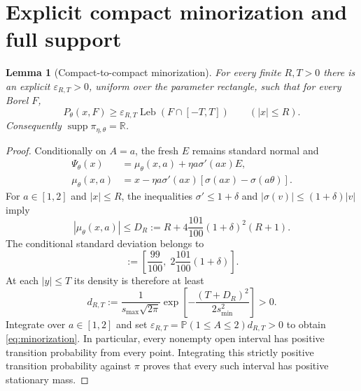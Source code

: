 \documentclass[11pt,a4paper]{article}
\numberwithin{equation}{section}
\newtheorem{lemma}[theorem]{Lemma}
\theoremstyle{remark}
\DeclareMathOperator{\Leb}{Leb}
\DeclareMathOperator{\supp}{supp}
\newcommand{\Pp}{\mathbb P}
\newcommand{\R}{\mathbb R}
\begin{document}
\section{Explicit compact minorization and full support}\label{sec:minorization}

\begin{lemma}[Compact-to-compact minorization]\label{lem:minorization}
For every finite $R,T>0$ there is an explicit $\varepsilon_{R,T}>0$,
uniform over the parameter rectangle, such that for every Borel $F$,
\begin{equation}
 P_\theta(x,F)\ge\varepsilon_{R,T}
        \Leb(F\cap[-T,T])\qquad(|x|\le R).\label{eq:minorization}
\end{equation}
Consequently $\supp\pi_{\eta,\theta}=\R$.
\end{lemma}

\begin{proof}
Conditionally on $A=a$, the fresh $E$ remains standard normal and
\begin{align}
 \Psi_\theta(x)&=\mu_\theta(x,a)+\eta a\sigma'(ax)E,\nonumber\\
 \mu_\theta(x,a)&=x-\eta a\sigma'(ax)
                    [\sigma(ax)-\sigma(a\theta)].\label{eq:conditional-mean}
\end{align}
For $a\in[1,2]$ and $|x|\le R$, the inequalities
$\sigma'\le1+\delta$ and $|\sigma(v)|\le(1+\delta)|v|$ imply
\begin{equation}
 |\mu_\theta(x,a)|\le D_R
 :=R+4\frac{101}{100}(1+\delta)^2(R+1).\label{eq:D-R}
\end{equation}
The conditional standard deviation belongs to
\begin{equation}
 [s_{\min},s_{\max}]
 :=\left[\frac{99}{100},\;2\frac{101}{100}(1+\delta)\right].
 \label{eq:s-bounds}
\end{equation}
At each $|y|\le T$ its density is therefore at least
\begin{equation}
 d_{R,T}:=\frac1{s_{\max}\sqrt{2\pi}}
 \exp\!\left[-\frac{(T+D_R)^2}{2s_{\min}^2}\right]>0.
 \label{eq:density-bound}
\end{equation}
Integrate over $a\in[1,2]$ and set
$\varepsilon_{R,T}=\Pp(1\le A\le2)d_{R,T}>0$ to obtain
\eqref{eq:minorization}. In particular, every nonempty open interval
has positive transition probability from every point. Integrating this
strictly positive transition probability against $\pi$ proves that every
such interval has positive stationary mass.
\end{proof}
\end{document}
